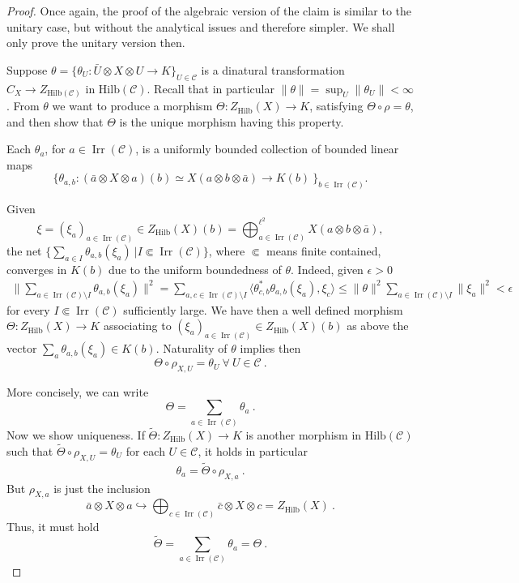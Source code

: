 \documentclass[a4paper,11pt,reqno]{amsart}
\numberwithin{equation}{section}
\theoremstyle{remark}
\theoremstyle{definition}
\newcommand{\cC}{\mathcal C}
\DeclareMathOperator{\Irr}{Irr}
\newcommand{\Hilb}{\mathrm{Hilb}}
\begin{document}
\begin{proof}
	Once again, the proof of the algebraic version of the claim is similar to the unitary case, but without the analytical issues and therefore simpler. We shall only prove the unitary version then.
	
	Suppose $\theta = \{ \theta_U: \bar{U} \otimes X \otimes U \to K\}_{U \in \cC}$ is a dinatural transformation $C_X \to Z_{\Hilb(\cC)}$ in $\Hilb(\cC)$. Recall that in particular $\| \theta \| = \sup_U \|\theta_U \| < \infty$. From $\theta$ we want to produce a morphism $\Theta: Z_\Hilb(X) \to K$, satisfying $\Theta \circ \rho = \theta$, and then show that $\Theta$ is the unique morphism having this property.
	
	Each $\theta_a$, for $a \in \Irr(\cC)$, is a uniformly bounded collection of bounded linear maps 
	\[\{ \theta_{a,b}: (\bar{a} \otimes X \otimes  a)(b) \simeq X(a \otimes b \otimes \bar{a}) \to K(b) \ \}_{b \in \Irr(\cC)}.
	\]
	
	Given 
	\[\xi = (\xi_a)_{a \in \Irr(\cC)} \in Z_{\Hilb}(X)(b) = \bigoplus_{a \in \Irr(\cC)}^{\ell^2} X(a \otimes b \otimes \bar{a}),
	\]
	the net $\{ \sum_{a \in I} \theta_{a,b}(\xi_a) \ | I \Subset \Irr(\cC)\}$, where $\Subset$ means finite contained, converges in $K(b)$ due to the uniform boundedness of $\theta$. Indeed, given $\epsilon > 0$ 
	\begin{align*}
		\| \sum_{a \in \Irr(\cC) \setminus I} \theta_{a,b}(\xi_a) \|^2 = \sum_{a,c \in \Irr(\cC) \setminus I} \langle \theta_{c,b}^* \theta_{a,b} (\xi_a),\xi_c \rangle \leq \|\theta\|^2 \sum_{a \in \Irr(\cC) \setminus I} \|\xi_a\|^2 < \epsilon
	\end{align*}
	for every $I \Subset \Irr(\cC)$ sufficiently large. We have then a well defined morphism $\Theta: Z_{\Hilb}(X) \to K$ associating to $(\xi_a)_{a \in \Irr(\cC)} \in Z_{\Hilb}(X)(b)$ as above the vector $\sum_a\theta_{a,b}(\xi_a) \in K(b)$. Naturality of $\theta$ implies then
	$$\Theta \circ \rho_{X,U} = \theta_U \ \forall \ U \in \cC \ . $$
	
	More concisely, we can write
	$$\Theta = \sum_{a \in \Irr(\cC)} \theta_a  \ . $$
	Now we show uniqueness. If $\tilde{\Theta}: Z_{\Hilb}(X) \to K$ is another morphism in $\Hilb(\cC)$ such that $\tilde{\Theta} \circ  \rho_{X,U} = \theta_U$ for each $U \in \cC$, it holds in particular
	$$\theta_a = \tilde{\Theta} \circ \rho_{X,a} \ . $$
	But $\rho_{X,a}$ is just the inclusion $$ \bar{a} \otimes X \otimes a \hookrightarrow \bigoplus_{c \in \Irr(\cC)} \bar{c} \otimes X \otimes c = Z_{\Hilb}(X) \ . $$
	Thus, it must hold
	$$\tilde{\Theta} = \sum_{a \in \Irr(\cC)} \theta_a = \Theta \ . $$
\end{proof} 
\end{document}
